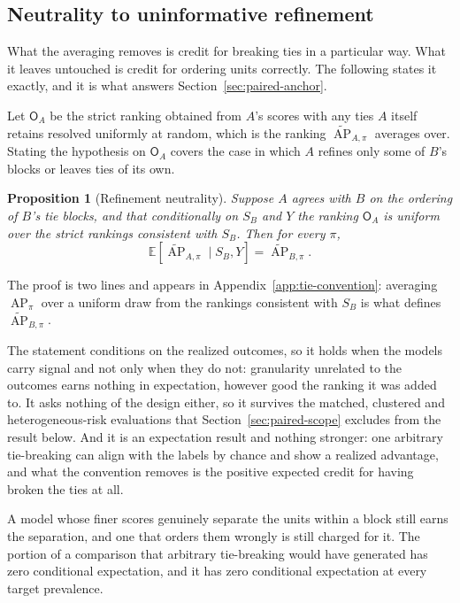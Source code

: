 \documentclass[11pt]{article}
\newcommand{\AP}{\operatorname{AP}}
\newcommand{\E}{\mathbb{E}}
\newcommand{\APta}{\widetilde{\AP}}
\newcommand{\Rank}{\mathsf{O}}
\newtheorem{proposition}{Proposition}
\theoremstyle{remark}
\begin{document}
\subsection{Neutrality to uninformative refinement}
\label{sec:refinement}

What the averaging removes is credit for breaking ties in a particular way. What it leaves untouched is credit for ordering units correctly. The following states it exactly, and it is what answers Section~\ref{sec:paired-anchor}.

Let $\Rank_A$ be the strict ranking obtained from $A$'s scores with any ties $A$ itself retains resolved uniformly at random, which is the ranking $\APta_{A,\pi}$ averages over. Stating the hypothesis on $\Rank_A$ covers the case in which $A$ refines only some of $B$'s blocks or leaves ties of its own.

\begin{proposition}[Refinement neutrality]
\label{prop:refinement}
Suppose $A$ agrees with $B$ on the ordering of $B$'s tie blocks, and that conditionally on $S_B$ and $Y$ the ranking $\Rank_A$ is uniform over the strict rankings consistent with $S_B$. Then for every $\pi$,
\[
\E\left[\APta_{A,\pi}\mid S_B,Y\right]
=
\APta_{B,\pi}.
\]
\end{proposition}

The proof is two lines and appears in Appendix~\ref{app:tie-convention}: averaging $\AP_\pi$ over a uniform draw from the rankings consistent with $S_B$ is what defines $\APta_{B,\pi}$.

The statement conditions on the realized outcomes, so it holds when the models carry signal and not only when they do not: granularity unrelated to the outcomes earns nothing in expectation, however good the ranking it was added to. It asks nothing of the design either, so it survives the matched, clustered and heterogeneous-risk evaluations that Section~\ref{sec:paired-scope} excludes from the result below. And it is an expectation result and nothing stronger: one arbitrary tie-breaking can align with the labels by chance and show a realized advantage, and what the convention removes is the positive expected credit for having broken the ties at all.

A model whose finer scores genuinely separate the units within a block still earns the separation, and one that orders them wrongly is still charged for it. The portion of a comparison that arbitrary tie-breaking would have generated has zero conditional expectation, and it has zero conditional expectation at every target prevalence.
\end{document}
